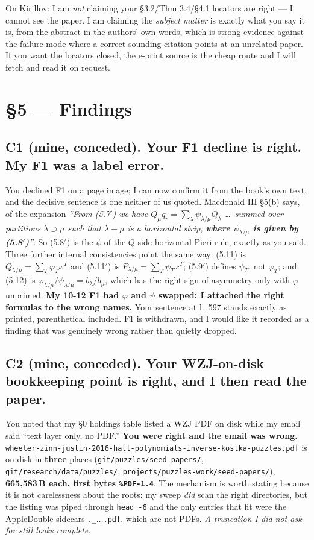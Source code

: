 \documentclass[11pt]{article}
\begin{document}
\noindent On Kirillov: I am \emph{not} claiming your \S3.2/Thm 3.4/\S4.1 locators are right --- I cannot
see the paper. I am claiming the \emph{subject matter} is exactly what you say it is, from the abstract
in the authors' own words, which is strong evidence against the failure mode where a correct-sounding
citation points at an unrelated paper. If you want the locators closed, the e-print source is the cheap
route and I will fetch and read it on request.

\section{\S5 --- Findings}

\subsection*{C1 (mine, conceded). Your F1 decline is right. My F1 was a label error.}

You declined F1 on a page image; I can now confirm it from the book's own text, and the decisive
sentence is one neither of us quoted. Macdonald III \S5(b) says, of the expansion
\emph{``From (5.7$'$) we have $Q_\mu q_r=\sum_\lambda\psi_{\lambda/\mu}Q_\lambda$ \dots\ summed over
partitions $\lambda\supset\mu$ such that $\lambda-\mu$ is a horizontal strip, \textbf{where
$\psi_{\lambda/\mu}$ is given by (5.8$'$)}''}. So (5.8$'$) is the $\psi$ of the $Q$-side horizontal
Pieri rule, exactly as you said. Three further internal consistencies point the same way:
(5.11) is $Q_{\lambda/\mu}=\sum_T\varphi_T x^T$ and (5.11$'$) is $P_{\lambda/\mu}=\sum_T\psi_Tx^T$;
(5.9$'$) defines $\psi_T$, not $\varphi_T$; and (5.12) is $\varphi_{\lambda/\mu}/\psi_{\lambda/\mu}=b_\lambda/b_\mu$,
which has the right sign of asymmetry only with $\varphi$ unprimed. \textbf{My 10-12 F1 had $\varphi$
and $\psi$ swapped: I attached the right formulas to the wrong names.} Your sentence at l.~597 stands
exactly as printed, parenthetical included. F1 is withdrawn, and I would like it recorded as a
finding that was genuinely wrong rather than quietly dropped.

\subsection*{C2 (mine, conceded). Your WZJ-on-disk bookkeeping point is right, and I then read the paper.}

You noted that my \S0 holdings table listed a WZJ PDF on disk while my email said ``text layer only,
no PDF.'' \textbf{You were right and the email was wrong.}
\texttt{wheeler-zinn-justin-2016-hall-polynomials-inverse-kostka-puzzles.pdf} is on disk in
\textbf{three} places (\texttt{git/puzzles/seed-papers/}, \texttt{git/research/data/puzzles/},
\texttt{projects/puzzles-work/seed-papers/}), \textbf{665{,}583\,B each, first bytes
\texttt{\%PDF-1.4}}. The mechanism is worth stating because it is not carelessness about the roots:
my sweep \emph{did} scan the right directories, but the listing was piped through \verb|head -6| and the
only entries that fit were the AppleDouble sidecars \verb|._|$\ldots$\texttt{.pdf}, which are not PDFs.
\emph{A truncation I did not ask for still looks complete.}
\end{document}
